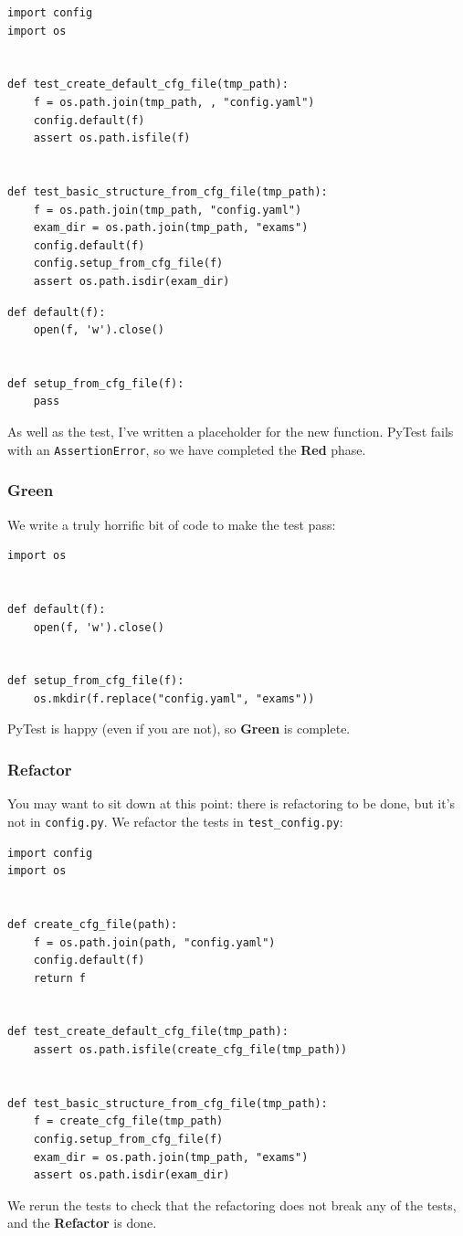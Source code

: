 \documentclass[10pt]{article}
\begin{document}
\begin{lstlisting}
import config
import os


def test_create_default_cfg_file(tmp_path):
    f = os.path.join(tmp_path, , "config.yaml")
    config.default(f)
    assert os.path.isfile(f)
    
    
def test_basic_structure_from_cfg_file(tmp_path):
    f = os.path.join(tmp_path, "config.yaml")
    exam_dir = os.path.join(tmp_path, "exams")
    config.default(f)
    config.setup_from_cfg_file(f)
    assert os.path.isdir(exam_dir)
\end{lstlisting}

\begin{lstlisting}
def default(f):
    open(f, 'w').close()


def setup_from_cfg_file(f):
    pass
\end{lstlisting}
As well as the test, I've written a placeholder for the new function. PyTest fails with an \texttt{AssertionError}, so we have completed the \textbf{Red} phase.

\subsubsection{Green}
We write a truly horrific bit of code to make the test pass:
\begin{lstlisting}
import os


def default(f):
    open(f, 'w').close()


def setup_from_cfg_file(f):
    os.mkdir(f.replace("config.yaml", "exams"))
\end{lstlisting}
PyTest is happy (even if you are not), so \textbf{Green} is complete.

\subsubsection{Refactor}
You may want to sit down at this point: there is refactoring to be done, but it's not in \texttt{config.py}. We refactor the tests in \texttt{test\_config.py}:
\begin{lstlisting}
import config
import os


def create_cfg_file(path):
    f = os.path.join(path, "config.yaml")
    config.default(f)
    return f


def test_create_default_cfg_file(tmp_path):
    assert os.path.isfile(create_cfg_file(tmp_path))


def test_basic_structure_from_cfg_file(tmp_path):
    f = create_cfg_file(tmp_path)
    config.setup_from_cfg_file(f)
    exam_dir = os.path.join(tmp_path, "exams")
    assert os.path.isdir(exam_dir)
\end{lstlisting}
We rerun the tests to check that the refactoring does not break any of the tests, and the \textbf{Refactor} is done.
\end{document}
